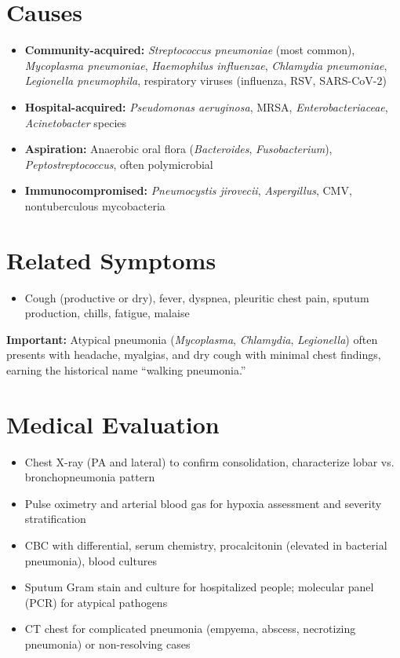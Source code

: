 \section*{Causes}
\begin{itemize}
  \item \textbf{Community-acquired:} \textit{Streptococcus pneumoniae} (most common), \textit{Mycoplasma pneumoniae}, \textit{Haemophilus influenzae}, \textit{Chlamydia pneumoniae}, \textit{Legionella pneumophila}, respiratory viruses (influenza, RSV, SARS-CoV-2)
  \item \textbf{Hospital-acquired:} \textit{Pseudomonas aeruginosa}, MRSA, \textit{Enterobacteriaceae}, \textit{Acinetobacter} species
  \item \textbf{Aspiration:} Anaerobic oral flora (\textit{Bacteroides}, \textit{Fusobacterium}), \textit{Peptostreptococcus}, often polymicrobial
  \item \textbf{Immunocompromised:} \textit{Pneumocystis jirovecii}, \textit{Aspergillus}, CMV, nontuberculous mycobacteria
\end{itemize}

\section*{Related Symptoms}
\begin{itemize}
  \item Cough (productive or dry), fever, dyspnea, pleuritic chest pain, sputum production, chills, fatigue, malaise
\end{itemize}
\textbf{Important:} Atypical pneumonia (\textit{Mycoplasma}, \textit{Chlamydia}, \textit{Legionella}) often presents with headache, myalgias, and dry cough with minimal chest findings, earning the historical name ``walking pneumonia.''

\section*{Medical Evaluation}
\begin{itemize}
  \item Chest X-ray (PA and lateral) to confirm consolidation, characterize lobar vs. bronchopneumonia pattern
  \item Pulse oximetry and arterial blood gas for hypoxia assessment and severity stratification
  \item CBC with differential, serum chemistry, procalcitonin (elevated in bacterial pneumonia), blood cultures
  \item Sputum Gram stain and culture for hospitalized people; molecular panel (PCR) for atypical pathogens
  \item CT chest for complicated pneumonia (empyema, abscess, necrotizing pneumonia) or non-resolving cases
\end{itemize}

